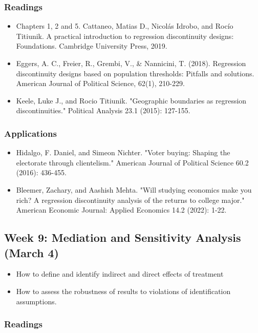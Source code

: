 \documentclass[11pt, article, oneside]{memoir}
\theoremstyle{Assumption}
\begin{document}
\subsubsection*{Readings}

\begin{itemize}
\item Chapters 1, 2 and 5. Cattaneo, Matias D., Nicolás Idrobo, and Rocío Titiunik. A practical introduction to regression discontinuity designs: Foundations. Cambridge University Press, 2019.
\item Eggers, A. C., Freier, R., Grembi, V., \& Nannicini, T. (2018). Regression discontinuity designs based on population thresholds: Pitfalls and solutions. American Journal of Political Science, 62(1), 210-229.
\item Keele, Luke J., and Rocio Titiunik. "Geographic boundaries as regression discontinuities." Political Analysis 23.1 (2015): 127-155.
\end{itemize}

\subsubsection*{Applications}

\begin{itemize}
\item Hidalgo, F. Daniel, and Simeon Nichter. "Voter buying: Shaping the electorate through clientelism." American Journal of Political Science 60.2 (2016): 436-455.
\item Bleemer, Zachary, and Aashish Mehta. "Will studying economics make you rich? A regression discontinuity analysis of the returns to college major." American Economic Journal: Applied Economics 14.2 (2022): 1-22.
\end{itemize}

\subsection{Week 9: Mediation and Sensitivity Analysis (March 4)}

\begin{itemize}
\item How to define and identify indirect and direct effects of treatment
\item How to assess the robustness of results to violations of identification assumptions. 
\end{itemize}

\subsubsection*{Readings}
\end{document}
